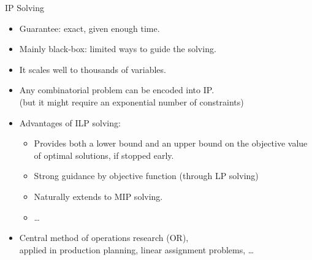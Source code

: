 \documentclass{cons-beamer}
\begin{document}
\begin{frame}{IP Solving}
  \begin{itemize}
    \item Guarantee: exact, given enough time. \vfill
    \item Mainly black-box: limited ways to guide the solving. \vfill
    \item It scales well to thousands of variables.
      \vfill
    \item \alert{Any combinatorial problem can be encoded into IP.} \\
      (but it might require an exponential number of constraints) \vfill
    \item Advantages of ILP solving:
      \begin{itemize}
        \item Provides both a lower bound and an upper bound on the
          objective value of optimal solutions, if stopped early.
        \item Strong guidance by objective function (through LP solving)
        \item Naturally extends to MIP solving.
        \item \dots
      \end{itemize} \vfill
    \item Central method of operations research (OR), \\ applied in
      production planning, linear assignment problems, \dots
  \end{itemize}
\end{frame}
\end{document}
